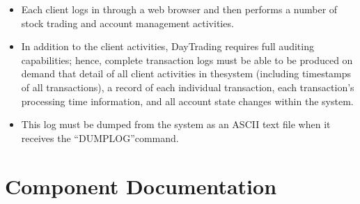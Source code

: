 \documentclass[a4paper,10pt]{article}
\begin{document}
\begin{itemize}
\item Each client logs in through a web browser and then performs a number of 
stock trading and account management activities.
\item In addition to the client activities, DayTrading requires full auditing 
capabilities; hence, complete transaction logs must be able to be produced on 
demand that detail of all client activities in thesystem (including timestamps 
of all transactions), a record of each individual transaction, each 
transaction’s processing time information, and all account state changes within 
the system. 
\item This log must be dumped from the system as an ASCII text file when it 
receives the “DUMPLOG”command.
 
\end{itemize}

\section{Component Documentation}
\subsection{}
\end{document}
